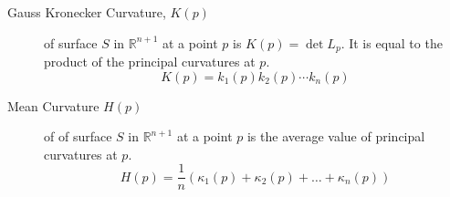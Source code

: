 \begin{description}
	\item[Gauss Kronecker Curvature, $K(p)$] of surface $S$ in $\mathbb{R}^{n+1}$ at a point $p$ is $K(p) = \det L_p$. It is equal to the product of the principal curvatures at $p$.
	\begin{equation}
		K(p) = k_1(p) k_2(p) \cdots k_n(p)
	\end{equation}
\item[Mean Curvature $H(p)$] of of surface $S$ in $\mathbb{R}^{n+1}$ at a point $p$ is the average value of principal curvatures at $p$.
	\begin{equation}
		H(p) = \frac{1}{n} (\kappa_1(p) + \kappa_2(p) + \dots + \kappa_n(p))
	\end{equation}
\end{description}


